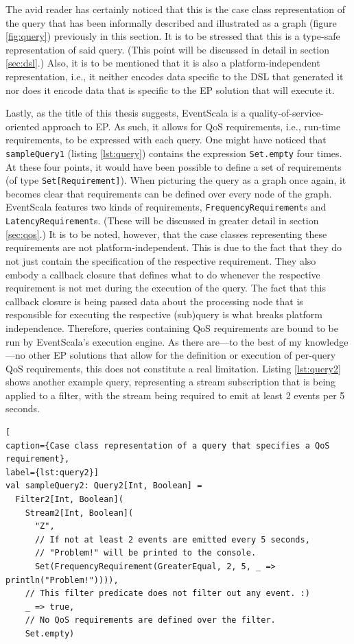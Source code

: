 \documentclass[article, 10pt, type=bsc, colorback, accentcolor=tud8b, parskip=half, bibliography=totocnumbered]{tudthesis}
\begin{document}
The avid reader has certainly noticed that this is the case class representation of the query that has been informally described and illustrated as a graph (figure \ref{fig:query}) previously in this section.
It is to be stressed that this is a type-safe representation of said query.
(This point will be discussed in detail in section \ref{sec:dsl}.)
Also, it is to be mentioned that it is also a platform-independent representation, i.e., it neither encodes data specific to the DSL that generated it nor does it encode data that is specific to the EP solution that will execute it.

Lastly, as the title of this thesis suggests, EventScala is a quality-of-service-oriented approach to EP.
As such, it allows for QoS requirements, i.e., run-time requirements, to be expressed with each query.
One might have noticed that \lstinline{sampleQuery1} (listing \ref{lst:query}) contains the expression \lstinline{Set.empty} four times.
At these four points, it would have been possible to define a set of requirements (of type \lstinline{Set[Requirement]}).
When picturing the query as a graph once again, it becomes clear that requirements can be defined over every node of the graph.
EventScala features two kinds of requirements, \lstinline{FrequencyRequirement}s and \lstinline{LatencyRequirement}s.
(These will be discussed in greater detail in section \ref{sec:qos}.)
It is to be noted, however, that the case classes representing these requirements are not platform-independent.
This is due to the fact that they do not just contain the specification of the respective requirement.
They also embody a callback closure that defines what to do whenever the respective requirement is not met during the execution of the query.
The fact that this callback closure is being passed data about the processing node that is responsible for executing the respective (sub)query is what breaks platform independence.
Therefore, queries containing QoS requirements are bound to be run by EventScala's execution engine.
As there are---to the best of my knowledge---no other EP solutions that allow for the definition or execution of per-query QoS requirements, this does not constitute a real limitation.
Listing \ref{lst:query2} shows another example query, representing a stream subscription that is being applied to a filter, with the stream being required to emit at least 2 events per 5 seconds.

\begin{lstlisting}[
caption={Case class representation of a query that specifies a QoS requirement},
label={lst:query2}]
val sampleQuery2: Query2[Int, Boolean] =
  Filter2[Int, Boolean](
    Stream2[Int, Boolean](
      "Z",
      // If not at least 2 events are emitted every 5 seconds,
      // "Problem!" will be printed to the console.
      Set(FrequencyRequirement(GreaterEqual, 2, 5, _ => println("Problem!")))),
    // This filter predicate does not filter out any event. :)
    _ => true,
    // No QoS requirements are defined over the filter.
    Set.empty)
\end{lstlisting}
\end{document}

